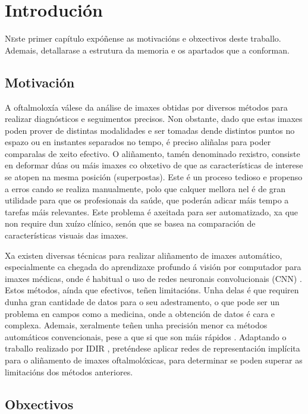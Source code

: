 \chapter{Introdución}
\label{chap:introducion}

\lettrine{N} este primer capítulo expóñense as motivacións e obxectivos deste traballo. Ademais, detallarase a estrutura da memoria e os apartados que a conforman.

\section{Motivación}
\label{sec:motivacion}

A oftalmoloxía válese da análise de imaxes obtidas por diversos métodos para realizar diagnósticos e seguimentos precisos.
Non obstante, dado que estas imaxes poden prover de distintas modalidades e ser tomadas dende distintos puntos no espazo ou en instantes separados no tempo, é preciso aliñalas para poder comparalas de xeito efectivo.
O aliñamento, tamén denominado rexistro, consiste en deformar dúas ou máis imaxes co obxetivo de que as características de interese se atopen na mesma posición (superpostas).
Este é un proceso tedioso e propenso a erros cando se realiza manualmente, polo que calquer mellora nel é de gran utilidade para que os profesionais da saúde, que poderán adicar máis tempo a tarefas máis relevantes.
Este problema é axeitada para ser automatizado, xa que non require dun xuízo clínico, senón que se basea na comparación de características visuais das imaxes.

Xa existen diversas técnicas para realizar aliñamento de imaxes automático, especialmente ca chegada do aprendizaxe profundo á visión por computador para imaxes médicas, onde é habitual o uso de redes neuronais convolucionais (\gls{CNN}) \cite{medicalimageanalysis}.
Estos métodos, aínda que efectivos, teñen limitacións. Unha delas é que requiren dunha gran cantidade de datos para o seu adestramento, o que pode ser un problema en campos como a medicina, onde a obtención de datos é cara e complexa. Ademais, xeralmente teñen unha precisión menor ca métodos automáticos convencionais, pese a que si que son máis rápidos \cite{bharati2022deeplearningmedicalimage}.
Adaptando o traballo realizado por IDIR \cite{wolterink2021implicit}, preténdese aplicar redes de representación implícita para o aliñamento de imaxes oftalmolóxicas, para determinar se poden superar as limitacións dos métodos anteriores.

\section{Obxectivos}
\label{sec:obxectivos}

